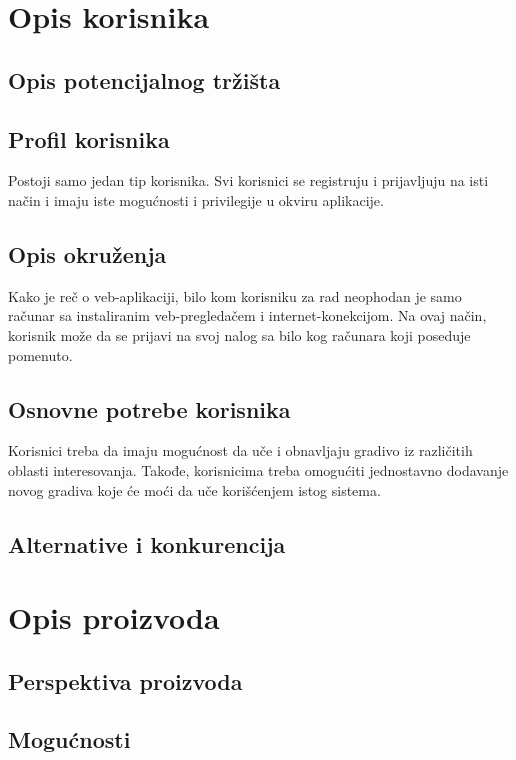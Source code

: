 \chapter{Opis korisnika}

\section{Opis potencijalnog tržišta}

\section{Profil korisnika}
Postoji samo jedan tip korisnika.
Svi korisnici se registruju i prijavljuju na isti način i imaju iste mogućnosti i privilegije u okviru aplikacije.

\section{Opis okruženja}
Kako je reč o veb-aplikaciji, bilo kom korisniku za rad neophodan je samo računar sa instaliranim veb-pregledačem i internet-konekcijom.
Na ovaj način, korisnik može da se prijavi na svoj nalog sa bilo kog računara koji poseduje pomenuto.

\section{Osnovne potrebe korisnika}
Korisnici treba da imaju mogućnost da uče i obnavljaju gradivo iz različitih oblasti interesovanja.
Takođe, korisnicima treba omogućiti jednostavno dodavanje novog gradiva koje će moći da uče korišćenjem istog sistema.

\section{Alternative i konkurencija}




\chapter{Opis proizvoda}

\section{Perspektiva proizvoda}

\section{Mogućnosti}

